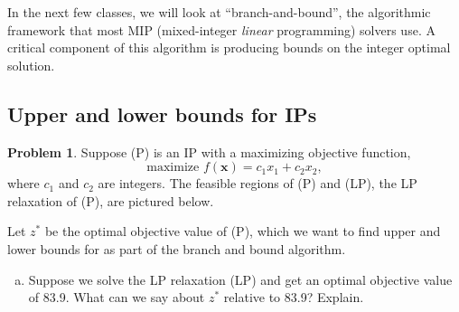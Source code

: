 \documentclass[11pt]{article}
\theoremstyle{definition}
\newtheorem{problem}{Problem}
\begin{document}
In the next few classes, we will look at ``branch-and-bound'', the algorithmic framework that most MIP (mixed-integer \emph{linear} programming) solvers use.  A critical component of this algorithm is producing bounds on the integer optimal solution.  

\subsection{Upper and lower bounds for IPs}
	
\begin{problem}
Suppose (P) is an IP with a maximizing objective function,
\[  \text{maximize } f(\mathbf{x}) = c_1 x_1 + c_2 x_2,  \]
where $c_1$ and $c_2$ are integers.  The feasible regions of (P) and (LP), the LP relaxation of (P), are pictured below.



\vspace{0.5cm}
\begin{center}
\begin{minipage}{6.5in}
\centering
{}
\hspace*{0.2in}
\end{minipage}
\end{center}


Let  $z^*$ be the optimal objective value of (P), which we want to find upper and lower bounds for as part of the branch and bound algorithm.

\begin{enumerate}[(a)]
\item    Suppose we solve the LP relaxation (LP) and get an optimal objective value of 83.9.  What can we say about $z^*$ relative to 83.9?  Explain.


\end{enumerate}
\end{problem}
\end{document}
